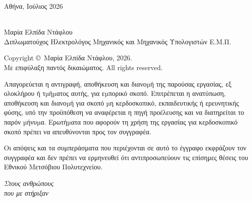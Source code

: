 \documentclass[12pt, a4paper]{article}
\begin{document}
\vfill
\begin{center}
{\large Αθήνα, Ιούλιος 2026}
\end{center}

\newpage

\thispagestyle{empty}
\noindent\underline{\hspace{5cm}}\\
Μαρία Ελπίδα Ντάφλου\\
Διπλωματούχος Ηλεκτρολόγος Μηχανικός και Μηχανικός Υπολογιστών Ε.Μ.Π.

\vspace*{\fill}
\noindent Copyright \copyright\ Μαρία Ελπίδα Ντάφλου, 2026.\\
Με επιφύλαξη παντός δικαιώματος. All rights reserved.

\vspace{0.5cm}
Απαγορεύεται η αντιγραφή, αποθήκευση και διανοµή της παρούσας εργασίας, εξ ολοκλήρου ή τµήµατος αυτής, για εµπορικό σκοπό. Επιτρέπεται η ανατύπωση, αποθήκευση και διανοµή για σκοπό µη κερδοσκοπικό, εκπαιδευτικής ή ερευνητικής φύσης, υπό την προϋπόθεση να αναφέρεται η πηγή προέλευσης και να διατηρείται το παρόν µήνυµα. Ερωτήµατα που αφορούν τη χρήση της εργασίας για κερδοσκοπικό σκοπό πρέπει να απευθύνονται προς τον συγγραφέα.

\vspace{0.5cm}
Οι απόψεις και τα συμπεράσματα που περιέχονται σε αυτό το έγγραφο εκφράζουν τον συγγραφέα και δεν πρέπει να ερμηνευθεί ότι αντιπροσωπεύουν τις επίσημες θέσεις του Εθνικού Μετσόβιου Πολυτεχνείου.

\newpage

\thispagestyle{empty}
\vspace*{8cm}
\begin{center}
\textit{Στους ανθρώπους\\
που με στήριξαν}
\end{center}

\clearpage
\thispagestyle{empty}
~
\clearpage

\setcounter{page}{7}   
\thispagestyle{plain}  
\end{document}
